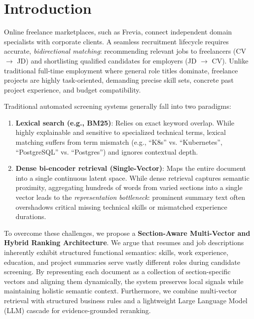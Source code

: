 \documentclass[runningheads]{llncs}
\begin{document}
\section{Introduction}

Online freelance marketplaces, such as Frevia, connect independent domain specialists with corporate clients. A seamless recruitment lifecycle requires accurate, \emph{bidirectional matching}: recommending relevant jobs to freelancers (CV $\rightarrow$ JD) and shortlisting qualified candidates for employers (JD $\rightarrow$ CV). Unlike traditional full-time employment where general role titles dominate, freelance projects are highly task-oriented, demanding precise skill sets, concrete past project experience, and budget compatibility.

Traditional automated screening systems generally fall into two paradigms:
\begin{enumerate}
    \item \textbf{Lexical search (e.g., BM25)}: Relies on exact keyword overlap. While highly explainable and sensitive to specialized technical terms, lexical matching suffers from term mismatch (e.g., ``K8s'' vs. ``Kubernetes'', ``PostgreSQL'' vs. ``Postgres'') and ignores contextual depth.
    \item \textbf{Dense bi-encoder retrieval (Single-Vector)}: Maps the entire document into a single continuous latent space. While dense retrieval captures semantic proximity, aggregating hundreds of words from varied sections into a single vector leads to the \emph{representation bottleneck}: prominent summary text often overshadows critical missing technical skills or mismatched experience durations.
\end{enumerate}

To overcome these challenges, we propose a \textbf{Section-Aware Multi-Vector and Hybrid Ranking Architecture}. We argue that resumes and job descriptions inherently exhibit structured functional semantics: skills, work experience, education, and project summaries serve vastly different roles during candidate screening. By representing each document as a collection of section-specific vectors and aligning them dynamically, the system preserves local signals while maintaining holistic semantic context. Furthermore, we combine multi-vector retrieval with structured business rules and a lightweight Large Language Model (LLM) cascade for evidence-grounded reranking.
\end{document}
